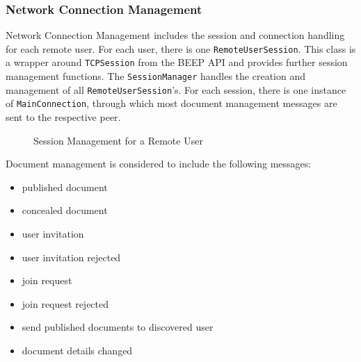 \subsubsection{Network Connection Management}
Network Connection Management includes the session and connection handling for each remote user. For each user, there is one \texttt{Remote\-User\-Session}. This class is a wrapper around \texttt{TCPSession} from the BEEP API and provides further session management functions. The \texttt{Session\-Manager} handles the creation and management of all \texttt{Remote\-User\-Session}'s. For each session, there is one instance of \texttt{MainConnection}, through which most document management messages are sent to the respective peer. 

\begin{figure}[H]
 \centering
 \caption{Session Management for a Remote User}
 \label{fig:network.discovery.sessionmanagement}
\end{figure}

Document management is considered to include the following messages:
\begin{itemize}
\item published document
\item concealed document
\item user invitation
\item user invitation rejected
\item join request
\item join request rejected
\item send published documents to discovered user
\item document details changed
\end{itemize}

